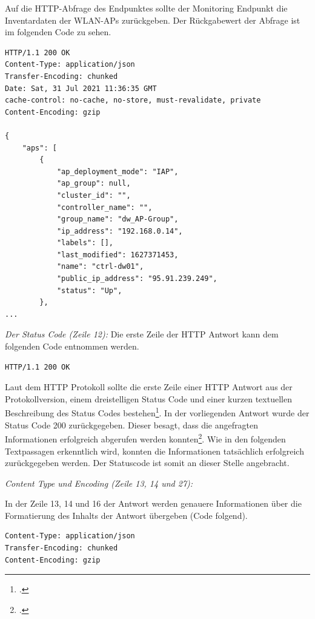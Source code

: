 Auf die HTTP-Abfrage des Endpunktes sollte der Monitoring Endpunkt die Inventardaten der WLAN-APs zurückgeben. Der Rückgabewert der Abfrage ist im folgenden Code zu sehen.

\small
\lstset{firstnumber=1}
\begin{lstlisting}
HTTP/1.1 200 OK
Content-Type: application/json
Transfer-Encoding: chunked
Date: Sat, 31 Jul 2021 11:36:35 GMT
cache-control: no-cache, no-store, must-revalidate, private
Content-Encoding: gzip
 
{
	"aps": [
		{
			"ap_deployment_mode": "IAP",
			"ap_group": null,
			"cluster_id": "",
			"controller_name": "",
			"group_name": "dw_AP-Group",
			"ip_address": "192.168.0.14",
			"labels": [],
			"last_modified": 1627371453,
			"name": "ctrl-dw01",
			"public_ip_address": "95.91.239.249",
			"status": "Up",
		},
...    
\end{lstlisting}

\emph{Der Status Code (Zeile 12):}
Die erste Zeile der HTTP Antwort kann dem folgenden Code entnommen werden.

\lstset{firstnumber=12}
\begin{lstlisting}
HTTP/1.1 200 OK
\end{lstlisting}

Laut dem HTTP Protokoll sollte die erste Zeile einer HTTP Antwort aus der Protokollversion, einem dreistelligen Status Code und einer kurzen textuellen Beschreibung des Status Codes bestehen\footcite[S. 39]{fielding_hypertext_1999}. In der vorliegenden Antwort wurde der Status Code 200 zurückgegeben. Dieser besagt, dass die angefragten Informationen erfolgreich abgerufen werden konnten\footcite[S. 58]{fielding_hypertext_1999}. Wie in den folgenden Textpassagen erkenntlich wird, konnten die Informationen tatsächlich erfolgreich zurückgegeben werden. Der Statuscode ist somit an dieser Stelle angebracht.

\emph{Content Type und Encoding (Zeile 13, 14 und 27):} 

In der Zeile 13, 14 und 16 der Antwort werden genauere Informationen über die Formatierung des Inhalts der Antwort übergeben (Code folgend). 

\lstset{firstnumber=13}
\begin{lstlisting}
Content-Type: application/json
Transfer-Encoding: chunked
Content-Encoding: gzip
\end{lstlisting}

